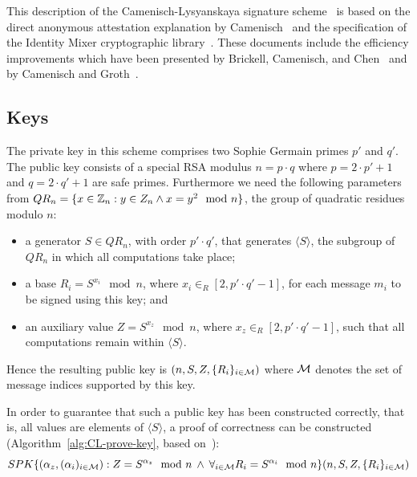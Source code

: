 This description of the Camenisch-Lysyanskaya signature
scheme~\cite{CamenischLysyanskaya2003,Lysyanskaya2002} is based on the
direct anonymous attestation explanation by Camenisch~\cite{Camenisch2007} and
the specification of the Identity Mixer cryptographic
library~\cite{IdemixCrypto2012}. These documents include the efficiency
improvements which have been presented by Brickell, Camenisch, and
Chen~\cite{BrickellCC2004} and by Camenisch and Groth~\cite{CamenischGroth2004}.

\subsection{Keys}\label{sec:cl_keys}

The private key in this scheme comprises two Sophie Germain primes $p'$ and $q'$.
The public key consists of a special RSA modulus $n = p \cdot q$ where
$p = 2 \cdot p' + 1$ and $q = 2 \cdot q' + 1$ are safe primes. Furthermore we
need the following parameters from
$QR_n = \{ x \in \mathbb{Z}_n: y \in Z_n \land x = y^2 \mod n \}$, the group of
quadratic residues modulo $n$:
\begin{itemize}
  \item a generator $S \in QR_n$, with order $p' \cdot q'$, that generates
    $\langle S \rangle$, the subgroup of $QR_n$ in which all computations take
    place;
  \item a base $R_i = S^{x_i} \mod n$, where $x_i \in_R [2, p' \cdot q' - 1]$,
    for each message $m_i$ to be signed using this key; and
  \item an auxiliary value $Z = S^{x_z} \mod n$, where
    $x_z \in_R [2, p' \cdot q' - 1]$, such that all computations remain within
    $\langle S \rangle$.
\end{itemize}
Hence the resulting public key is $(n, S, Z, \{R_i\}_{i \in \mathcal{M}})$ where $\mathcal{M}$
denotes the set of message indices supported by this key.

In order to guarantee that such a public key has been constructed correctly,
that is, all values are elements of $\langle S \rangle$, a proof of
correctness can be constructed (Algorithm~\ref{alg:CL-prove-key}, based
on~\cite[Appendix A]{BrickellCC2004}):
\begin{equation*}
  SPK \{ (\alpha_z, (\alpha_i)_{i \in \mathcal{M}}) : Z = S^{\alpha_z} \mod n
    \:\land\: \forall_{i \in \mathcal{M}} R_i = S^{\alpha_i} \mod n
  \}(n, S, Z, \{R_i\}_{i \in \mathcal{M}})
\end{equation*}

